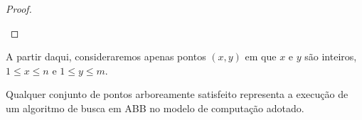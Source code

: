\begin{proof}
\begin{center}
\begin{minipage}[t]{0.4\textwidth}
\begin{figure}[H]
\begin{adjustbox}{valign=t}
            \end{adjustbox}
            \label{fig:tikz-captions}
        \end{figure}
    \end{minipage}
    \end{center}
\vspace{-0.7cm}
\end{proof}

A partir daqui, consideraremos apenas pontos $(x,y)$ em que $x$ e $y$ são inteiros, $1 \leq x \leq n$ e $1 \leq y \leq m$.

\begin{lemma}Qualquer conjunto de pontos arboreamente satisfeito representa a execução de um algoritmo de busca em ABB no modelo de computação adotado.
\end{lemma}

